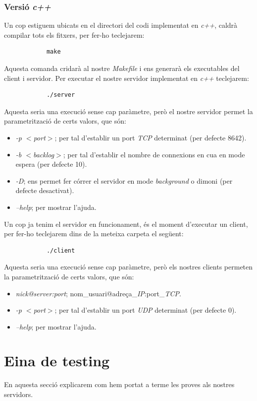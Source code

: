 \documentclass[a4paper,10pt]{article}
\begin{document}
		\subsubsection{Versió \emph{c++}}
		Un cop estiguem ubicats en el directori del codi implementat en \emph{c++}, caldrà compilar tots els fitxers, per fer-ho teclejarem:
			\begin{verbatim}
 			make
			\end{verbatim}
		Aquesta comanda cridarà al nostre \emph{Makefile} i ens generarà els executables del client i servidor. Per executar el nostre servidor implementat en \emph{c++} teclejarem:
			\begin{verbatim}
			./server
			\end{verbatim}
		Aquesta seria una execució sense cap paràmetre, però el nostre servidor permet la parametrització de certs valors, que són:
			\begin{itemize}
			\item \emph{-p $<$port$>$}; per tal d'establir un port \emph{TCP} determinat (per defecte 8642).
			\item \emph{-b $<$backlog$>$}; per tal d'establir el nombre de connexions en cua en mode espera (per defecte 10).
			\item \emph{-D}; ens permet fer córrer el servidor en mode \emph{background} o dimoni (per defecte desactivat).
			\item \emph{--help}; per mostrar l'ajuda.
			\end{itemize}
		Un cop ja tenim el servidor en funcionament, és el moment d'executar un client, per fer-ho teclejarem dins de la meteixa carpeta el següent:
			\begin{verbatim}
			./client 
			\end{verbatim}
		Aquesta seria una execució sense cap paràmetre, però els nostres clients permeten la parametrització de certs valors, que són:
			\begin{itemize}
			\item \emph{nick@server:port}; nom\_usuari@adreça\_\emph{IP}:port\_\emph{TCP}.
			\item \emph{-p $<$port$>$}; per tal d'establir un port \emph{UDP} determinat (per defecte 0).
			\item \emph{--help}; per mostrar l'ajuda.
			\end{itemize}

\pagebreak
\section{Eina de testing}
En aquesta secció explicarem com hem portat a terme les proves als nostres servidors.
	
\end{document}
